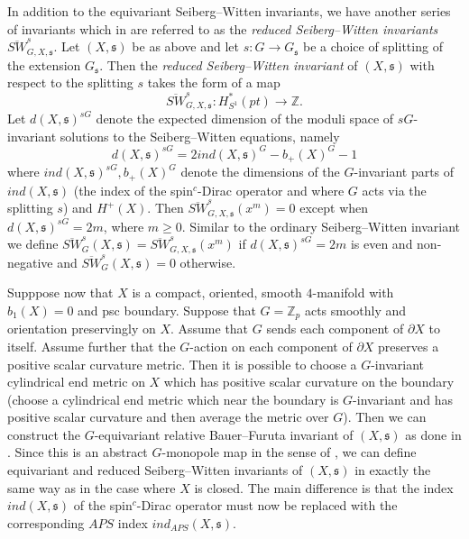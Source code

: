 \documentclass{amsart}
\theoremstyle{definition}
\theoremstyle{remark}
\numberwithin{equation}{section}
\begin{document}
In addition to the equivariant Seiberg--Witten invariants, we have another series of invariants which in \cite{bar} are referred to as the {\em reduced Seiberg--Witten invariants} $\overline{SW}^s_{G , X,\mathfrak{s}}$. Let $(X , \mathfrak{s})$ be as above and let $s : G \to G_{\mathfrak{s}}$ be a choice of splitting of the extension $G_{\mathfrak{s}}$. Then the {\em reduced Seiberg--Witten invariant} of $(X , \mathfrak{s})$ with respect to the splitting $s$ takes the form of a map
\[
\overline{SW}^s_{G , X , \mathfrak{s}} : H^*_{S^1}(pt) \to \mathbb{Z}.
\]
Let $d(X , \mathfrak{s})^{sG}$ denote the expected dimension of the moduli space of $sG$-invariant solutions to the Seiberg--Witten equations, namely
\[
d(X , \mathfrak{s})^{sG} = 2 ind(X , \mathfrak{s})^G - b_+(X)^G - 1
\]
where $ind(X , \mathfrak{s})^{sG}, b_+(X)^G$ denote the dimensions of the $G$-invariant parts of $ind(X,\mathfrak{s})$ (the index of the spin$^c$-Dirac operator and where $G$ acts via the splitting $s$) and $H^+(X)$. Then $\overline{SW}^s_{G , X , \mathfrak{s}}(x^m) = 0$ except when $d(X , \mathfrak{s})^{sG} = 2m$, where $m \ge 0$. Similar to the ordinary Seiberg--Witten invariant we define $\overline{SW}^s_G(X , \mathfrak{s}) = \overline{SW}^s_{G , X , \mathfrak{s}}(x^m)$ if $d(X,\mathfrak{s})^{sG} = 2m$ is even and non-negative and $\overline{SW}^s_G(X , \mathfrak{s}) = 0$ otherwise.

Supppose now that $X$ is a compact, oriented, smooth $4$-manifold with $b_1(X) = 0$ and psc boundary. Suppose that $G = \mathbb{Z}_p$ acts smoothly and orientation preservingly on $X$. Assume that $G$ sends each component of $\partial X$ to itself. Assume further that the $G$-action on each component of $\partial X$ preserves a positive scalar curvature metric. Then it is possible to choose a $G$-invariant cylindrical end metric on $X$ which has positive scalar curvature on the boundary (choose a cylindrical end metric which near the boundary is $G$-invariant and has positive scalar curvature and then average the metric over $G$). Then we can construct the $G$-equivariant relative Bauer--Furuta invariant of $(X , \mathfrak{s})$ as done in \cite[]{bh}. Since this is an abstract $G$-monopole map in the sense of \cite[Definition 2.1]{bar}, we can define equivariant and reduced Seiberg--Witten invariants of $(X , \mathfrak{s})$ in exactly the same way as in the case where $X$ is closed. The main difference is that the index $ind(X , \mathfrak{s})$ of the spin$^c$-Dirac operator must now be replaced with the corresponding $APS$ index $ind_{APS}(X , \mathfrak{s})$.
\end{document}
